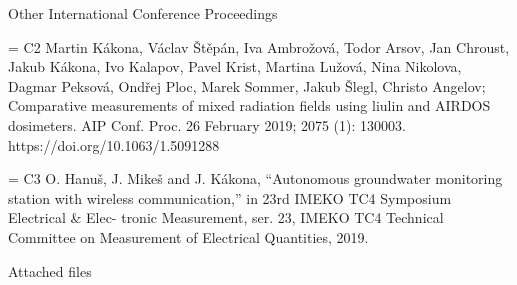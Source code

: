 \secc Other International Conference Proceedings

\bib[c2] = {C2} Martin Kákona, Václav Štěpán, Iva Ambrožová, Todor Arsov, Jan Chroust, Jakub Kákona, Ivo Kalapov, Pavel Krist, Martina Lužová, Nina Nikolova, Dagmar Peksová, Ondřej Ploc, Marek Sommer, Jakub Šlegl, Christo Angelov; Comparative measurements of mixed radiation fields using liulin and AIRDOS dosimeters. AIP Conf. Proc. 26 February 2019; 2075 (1): 130003. https://doi.org/10.1063/1.5091288

\bib[c3] = {C3} O. Hanuš, J. Mikeš and J. Kákona, “Autonomous groundwater monitoring station
with wireless communication,” in 23rd IMEKO TC4 Symposium Electrical \& Elec-
tronic Measurement, ser. 23, IMEKO TC4 Technical Committee on Measurement of
Electrical Quantities, 2019.

 Attached files


\bye
